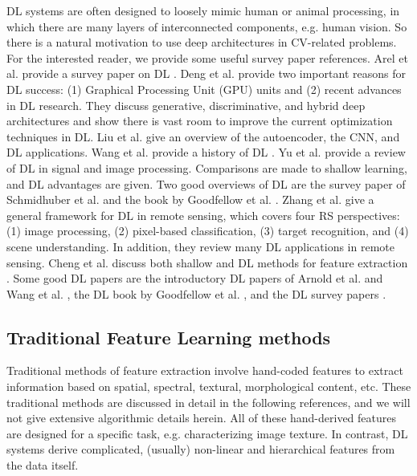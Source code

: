 \documentclass[12pt]{spieman}
\begin{document}
\begin{spacing}{1}
DL systems are often designed to loosely mimic human or animal processing, in which there are many layers of interconnected components, e.g. human vision. So there is a natural motivation to use deep architectures in CV-related problems. For the interested reader, we provide some useful survey paper references. Arel et al. provide a survey paper on DL \cite{Arel2010} . Deng et al. \cite{Deng2014} provide two important reasons for DL success: (1) Graphical Processing Unit (GPU) units and (2) recent advances in DL research. They discuss generative, discriminative, and hybrid deep architectures and show there is vast room to improve the current optimization techniques in DL. Liu et al. \cite{liu2016survey} give an overview of the autoencoder, the CNN, and DL applications. Wang et al. provide a history of DL \cite{wang2015survey} . Yu et al. \cite{Yu2011} provide a review of DL in signal and image processing. Comparisons are made to shallow learning, and DL advantages are given. Two good overviews of DL are the survey paper of Schmidhuber et al. \cite{Schmidhuber2015} and the book by Goodfellow et al. \cite{goodfellow2016deep}. Zhang et al. \cite{Zhang2016} give a general framework for DL in remote sensing, which covers four RS perspectives: (1) image processing, (2) pixel-based classification, (3) target recognition, and (4) scene understanding. In addition, they review many DL applications in remote sensing. Cheng et al. discuss both shallow and DL methods for feature extraction \cite{Cheng}. Some good DL papers are the introductory DL papers of Arnold et al. \cite{Arnold2012Introduction} and Wang et al. \cite{wang2015survey} , the DL book by Goodfellow et al. \cite{goodfellow2016deep} , and the DL survey papers \cite{Schmidhuber2015, bengio2012unsupervised, Chen2014, Deng2013Deep, Deng2014, liu2016survey, Najafabadi2015Deep, wang2015survey, Wan2014Deep} .

\subsection{Traditional Feature Learning methods}
Traditional methods of feature extraction involve hand-coded features to extract information based on spatial, spectral, textural, morphological content, etc. These traditional methods are discussed in detail in the following references, and we will not give extensive algorithmic details herein. All of these hand-derived features are designed for a specific task, e.g. characterizing image texture. In contrast, DL systems derive complicated, (usually) non-linear and hierarchical features from the data itself.


\end{spacing}
\end{document}
